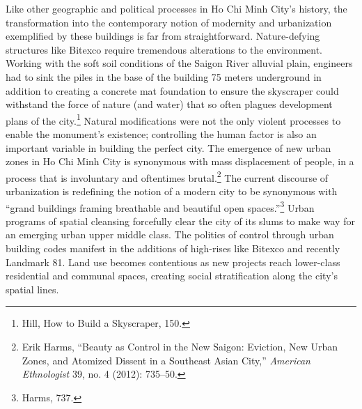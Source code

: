 Like other geographic and political processes in Ho Chi Minh City’s history, the transformation into the contemporary notion of modernity and urbanization exemplified by these buildings is far from straightforward. Nature-defying structures like Bitexco require tremendous alterations to the environment. Working with the soft soil conditions of the Saigon River alluvial plain, engineers had to sink the piles in the base of the building 75 meters underground in addition to creating a concrete mat foundation to ensure the skyscraper could withstand the force of nature (and water) that so often plagues development plans of the city.\footnote{Hill, How to Build a Skyscraper, 150.} Natural modifications were not the only violent processes to enable the monument’s existence; controlling the human factor is also an important variable in building the perfect city. The emergence of new urban zones in Ho Chi Minh City is synonymous with mass displacement of people, in a process that is involuntary and oftentimes brutal.\footnote{Erik Harms, “Beauty as Control in the New Saigon: Eviction, New Urban Zones, and Atomized Dissent in a Southeast Asian City,” \textit{American Ethnologist} 39, no. 4 (2012): 735–50.} The current discourse of urbanization is redefining the notion of a modern city to be synonymous with “grand buildings framing breathable and beautiful open spaces.”\footnote{Harms, 737.} Urban programs of spatial cleansing forcefully clear the city of its slums to make way for an emerging urban upper middle class. The politics of control through urban building codes manifest in the additions of high-rises like Bitexco and recently Landmark 81. Land use becomes contentious as new projects reach lower-class residential and communal spaces, creating social stratification along the city’s spatial lines.

